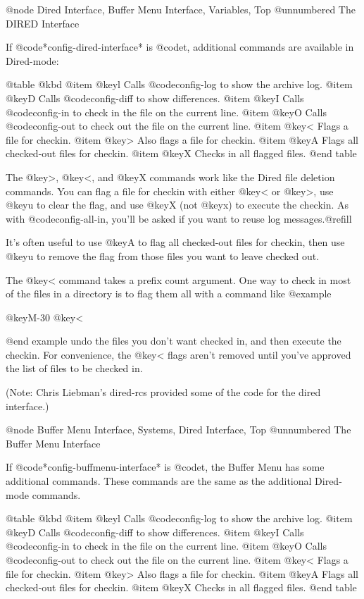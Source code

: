 @node Dired Interface, Buffer Menu Interface, Variables, Top
@unnumbered The DIRED Interface

If @code{*config-dired-interface*} is @code{t}, additional commands
are available in Dired-mode:

@table @kbd
@item @key{l}
Calls @code{config-log} to show the archive log.
@item @key{D}
Calls @code{config-diff} to show differences.
@item @key{I}
Calls @code{config-in} to check in the file on the current line.
@item @key{O}
Calls @code{config-out} to check out the file on the current line.
@item @key{<}
Flags a file for checkin.
@item @key{>}
Also flags a file for checkin.
@item @key{A}
Flags all checked-out files for checkin.
@item @key{X}
Checks in all flagged files.
@end table

The @key{>}, @key{<}, and @key{X} commands work like the Dired file
deletion commands.  You can flag a file for checkin with either
@key{<} or @key{>}, use @key{u} to clear the flag, and use @key{X}
(not @key{x}) to execute the checkin.  As with @code{config-all-in},
you'll be asked if you want to reuse log messages.@refill

It's often useful to use @key{A} to flag all checked-out files for
checkin, then use @key{u} to remove the flag from those files you want
to leave checked out.

The @key{<} command takes a prefix count argument.  One way to check
in most of the files in a directory is to flag them all with a command like
@example

@key{M-30} @key{<}

@end example
undo the files you don't want checked in, and then execute the
checkin.  For convenience, the @key{<} flags aren't removed until
you've approved the list of files to be checked in.


(Note:  Chris Liebman's dired-rcs provided some of the code for the dired
interface.)

@node Buffer Menu Interface, Systems, Dired Interface, Top
@unnumbered The Buffer Menu Interface

If @code{*config-buffmenu-interface*} is @code{t}, the Buffer Menu has
some additional commands.  These commands are the same as the
additional Dired-mode commands.

@table @kbd
@item @key{l}
Calls @code{config-log} to show the archive log.
@item @key{D}
Calls @code{config-diff} to show differences.
@item @key{I}
Calls @code{config-in} to check in the file on the current line.
@item @key{O}
Calls @code{config-out} to check out the file on the current line.
@item @key{<}
Flags a file for checkin.
@item @key{>}
Also flags a file for checkin.
@item @key{A}
Flags all checked-out files for checkin.
@item @key{X}
Checks in all flagged files.
@end table

